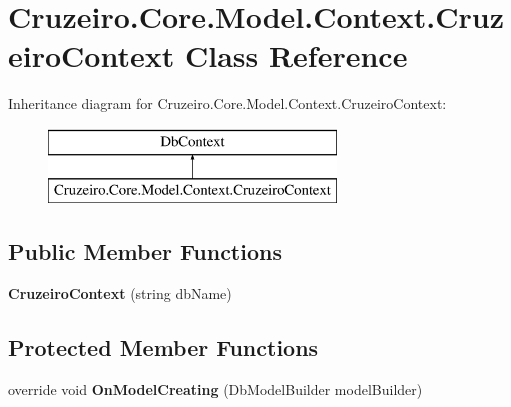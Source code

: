 \hypertarget{class_cruzeiro_1_1_core_1_1_model_1_1_context_1_1_cruzeiro_context}{}\section{Cruzeiro.\+Core.\+Model.\+Context.\+Cruzeiro\+Context Class Reference}
\label{class_cruzeiro_1_1_core_1_1_model_1_1_context_1_1_cruzeiro_context}
Inheritance diagram for Cruzeiro.\+Core.\+Model.\+Context.\+Cruzeiro\+Context\+:\begin{figure}[H]
\begin{center}
\leavevmode
\includegraphics[height=2.000000cm]{class_cruzeiro_1_1_core_1_1_model_1_1_context_1_1_cruzeiro_context}
\end{center}
\end{figure}
\subsection*{Public Member Functions}
\begin{DoxyCompactItemize}
\item 
{\bfseries Cruzeiro\+Context} (string db\+Name)\hypertarget{class_cruzeiro_1_1_core_1_1_model_1_1_context_1_1_cruzeiro_context_aba482f07eebd3eaa9c37831d4916905f}{}\label{class_cruzeiro_1_1_core_1_1_model_1_1_context_1_1_cruzeiro_context_aba482f07eebd3eaa9c37831d4916905f}

\end{DoxyCompactItemize}
\subsection*{Protected Member Functions}
\begin{DoxyCompactItemize}
\item 
override void {\bfseries On\+Model\+Creating} (Db\+Model\+Builder model\+Builder)\hypertarget{class_cruzeiro_1_1_core_1_1_model_1_1_context_1_1_cruzeiro_context_a81c777c67236e122b143648b273d4096}{}\label{class_cruzeiro_1_1_core_1_1_model_1_1_context_1_1_cruzeiro_context_a81c777c67236e122b143648b273d4096}

\end{DoxyCompactItemize}
